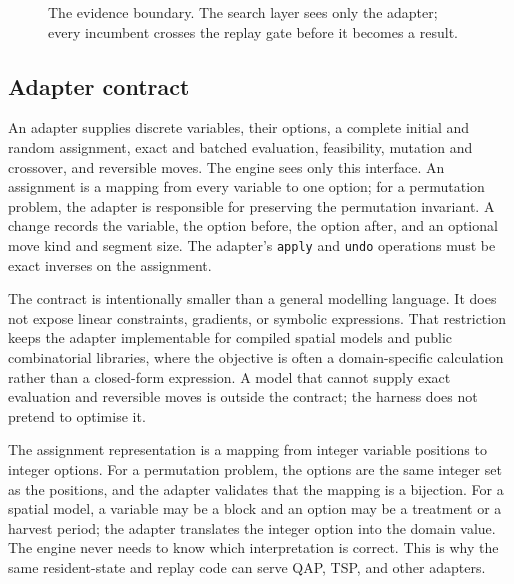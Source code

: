 \documentclass[11pt]{article}
\begin{document}
\begin{figure}[t]
\centering
{}
\caption{The evidence boundary. The search layer sees only the adapter; every incumbent crosses the replay gate before it becomes a result.}
\label{fig:architecture}
\end{figure}

\subsection{Adapter contract}

An adapter supplies discrete variables, their options, a complete initial and random assignment,
exact and batched evaluation, feasibility, mutation and crossover, and reversible moves. The engine
sees only this interface. An assignment is a mapping from every variable to one option; for a
permutation problem, the adapter is responsible for preserving the permutation invariant. A change
records the variable, the option before, the option after, and an optional move kind and segment size.
The adapter's \texttt{apply} and \texttt{undo} operations must be exact inverses on the assignment.

The contract is intentionally smaller than a general modelling language. It does not expose linear
constraints, gradients, or symbolic expressions. That restriction keeps the adapter implementable for
compiled spatial models and public combinatorial libraries, where the objective is often a
domain-specific calculation rather than a closed-form expression. A model that cannot supply exact
evaluation and reversible moves is outside the contract; the harness does not pretend to optimise it.

The assignment representation is a mapping from integer variable positions to integer options. For a
permutation problem, the options are the same integer set as the positions, and the adapter validates
that the mapping is a bijection. For a spatial model, a variable may be a block and an option may be
a treatment or a harvest period; the adapter translates the integer option into the domain value.
The engine never needs to know which interpretation is correct. This is why the same resident-state
and replay code can serve QAP, TSP, and other adapters.
\end{document}
